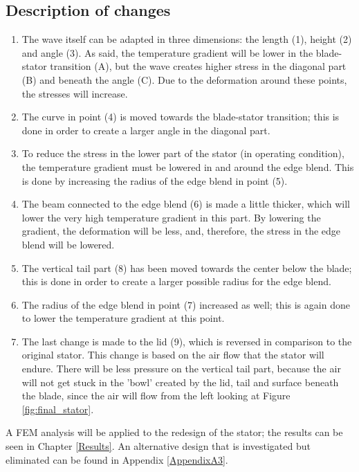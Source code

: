 \subsection{Description of changes}
\begin{enumerate}
\item The wave itself can be adapted in three dimensions: the length (1), height (2) and angle (3). As said, the temperature gradient will be lower in the blade-stator transition (A), but the wave creates higher stress in the diagonal part (B) and beneath the angle (C). Due to the deformation around these points, the stresses will increase. 
\item The curve in point (4) is moved towards the blade-stator transition; this is done in order to create a larger angle in the diagonal part.
\item To reduce the stress in the lower part of the stator (in operating condition), the temperature gradient must be lowered in and around the edge blend. This is done by increasing the radius of the edge blend in point (5).
\item The beam connected to the edge blend (6) is made a little thicker, which will lower the very high temperature gradient in this part. By lowering the gradient, the deformation will be less, and, therefore, the stress in the edge blend will be lowered.
\item The vertical tail part (8) has been moved towards the center below the blade; this is done in order to create a larger possible radius for the edge blend.
\item The radius of the edge blend in point (7) increased as well; this is again done to lower the temperature gradient at this point.
\item The last change is made to the lid (9), which is reversed in comparison to the original stator. This change is based on the air flow that the stator will endure. There will be less pressure on the vertical tail part, because the air will not get stuck in the 'bowl' created by the lid, tail and surface beneath the blade, since the air will flow from the left looking at Figure \ref{fig:final_stator}.
\end{enumerate}
A FEM analysis will be applied to the redesign of the stator; the results can be seen in Chapter \ref{Results}. An alternative design that is investigated but eliminated can be found in Appendix \ref{AppendixA3}.

